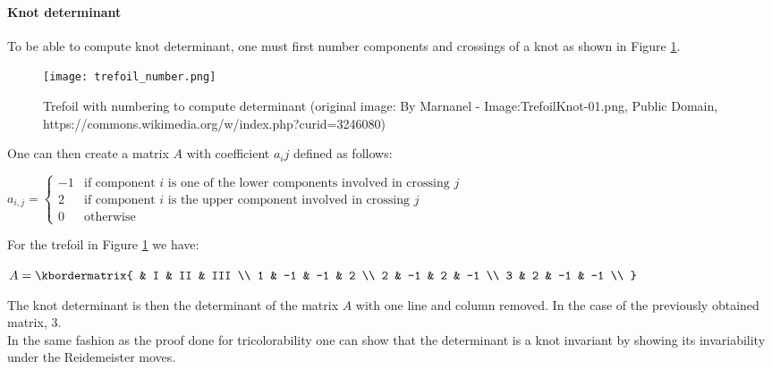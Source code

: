 \documentclass[12pt, a4paper]{article}
\begin{document}
\paragraph{Knot determinant}
\label{sec:knot_det}

To be able to compute knot determinant, one must first number components and crossings of a knot as shown in Figure \ref{fig:trefoil_number}.

\begin{figure}[H]
  \centering
  \texttt{[image: trefoil\_number.png]}
  \caption{Trefoil with numbering to compute determinant (original image: By Marnanel - Image:TrefoilKnot-01.png, Public Domain, https://commons.wikimedia.org/w/index.php?curid=3246080)}
  \label{fig:trefoil_number}
\end{figure}

One can then create a matrix $A$ with coefficient $a_{i}{j}$ defined as follows:\\

\begin{center}
  $a_{i,j} =
  \begin{cases}
    -1 &\text{if component $i$ is one of the lower components involved in crossing $j$}\\
    2 &\text{if component $i$ is the upper component involved in crossing $j$}\\
    0 &\text{otherwise}
  \end{cases}$
\end{center}

For the trefoil in Figure \ref{fig:trefoil_number} we have:

\begin{center}
$
  A = \kbordermatrix{
    & I & II & III \\
    1 & -1 & -1 & 2  \\
    2 & -1 & 2 & -1  \\
    3 & 2 & -1 & -1  \\
  }
$
\end{center}

The knot determinant is then the determinant of the matrix $A$ with one line and column removed. In the case of the previously obtained matrix, 3.\\

In the same fashion as the proof done for tricolorability one can show that the determinant is a knot invariant by showing its invariability under the Reidemeister moves.\\
\end{document}
